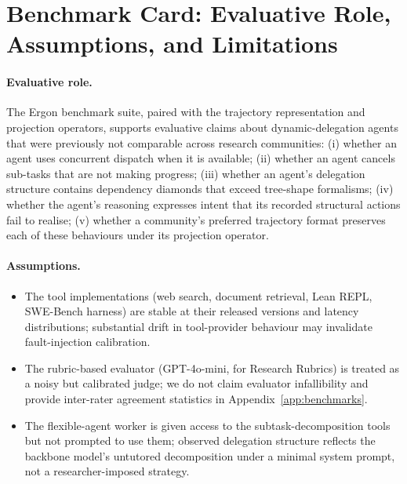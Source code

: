 \documentclass{article}
\begin{document}

\section{Benchmark Card: Evaluative Role, Assumptions, and Limitations}
\label{app:benchmarkcard}

\paragraph{Evaluative role.}
The Ergon benchmark suite, paired with the trajectory
representation and projection operators, supports evaluative
claims about dynamic-delegation agents that were previously not
comparable across research communities: (i) whether an agent
uses concurrent dispatch when it is available; (ii) whether an
agent cancels sub-tasks that are not making progress; (iii)
whether an agent's delegation structure contains dependency
diamonds that exceed tree-shape formalisms; (iv) whether the
agent's reasoning expresses intent that its recorded structural
actions fail to realise; (v) whether a community's preferred
trajectory format preserves each of these behaviours under its
projection operator.

\paragraph{Assumptions.}
\begin{itemize}
  \item The tool implementations (web search, document retrieval,
    Lean REPL, SWE-Bench harness) are stable at their released
    versions and latency distributions; substantial drift in
    tool-provider behaviour may invalidate fault-injection
    calibration.
  \item The rubric-based evaluator (GPT-4o-mini, for Research
    Rubrics) is treated as a noisy but calibrated judge; we do not
    claim evaluator infallibility and provide inter-rater agreement
    statistics in Appendix~\ref{app:benchmarks}.
  \item The flexible-agent worker is given access to the
    subtask-decomposition tools but not prompted to use them;
    observed delegation structure reflects the backbone model's
    untutored decomposition under a minimal system prompt, not a
    researcher-imposed strategy.
\end{itemize}
\end{document}

